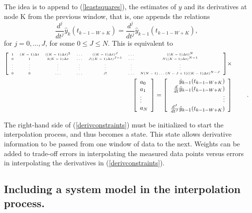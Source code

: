 The idea is to append to (\ref{leastsquares}), the estimates of $y$ and
its derivatives at node K from the previous window, that is, one appends
the relations
\begin{equation}
\frac{d^j}{dt^j} \hat{y}_k(t_{k-1-W+K}) =  \frac{d^j}{dt^j} \hat{y}_{k-1}(t_{k-1-W+K}),
\label{derivconstraints}
\end{equation}
for $j=0, \ldots, J$, for some $0 \le J \le N$.
This is equivalent to
\begin{eqnarray} {\tiny
\left[ \begin{array}{ccccccc} 
1 & (K-1) \Delta t & ((K-1)\Delta t)^2 & \ldots & ((K-1) \Delta t)^J & 
\ldots & ((K-1) \Delta t)^N \\
0 & 1 & 2(K-1) \Delta t & \ldots & J((K-1) \Delta t)^{J-1} & \ldots & 
N((K-1) \Delta t)^{N-1} \\
\vdots & \vdots & \vdots & \vdots & \vdots & \vdots & \vdots \\
0 & 0 & \ldots & \ldots & J! & \ldots & N(N-1)\ldots(N-J+1)((K-1) \Delta t)^{N-J}
\end{array} \right] } \times & \mbox{ } &  \nonumber \\
\left[ \begin{array}{l} a_0 \\ a_1 \\ \vdots \\ a_N \end{array} \right] 
 =  \left[ \begin{array}{r} 
\hat{y}_{k-1}(t_{k-1-W+K}) \\
\frac{d}{dt} \hat{y}_{k-1}(t_{k-1-W+K}) \\ 
\vdots \\ 
\frac{d^J}{dt^J} \hat{y}_{k-1}(t_{k-1-W+K})
\end{array} \right] & \mbox{\hspace*{.2in}} &.
\label{matrixderivconstraints}
\end{eqnarray}

The right-hand side of (\ref{derivconstraints}) must be initialized to
start the interpolation process, and thus becomes a state.  This state 
allows derivative 
information to be passed from one window of data 
to the next.   
Weights can be added to trade-off errors in interpolating the measured data points
versus errors in interpolating the derivatives in (\ref{derivconstraints}).  



\subsection{Including a system model in the interpolation process.}


